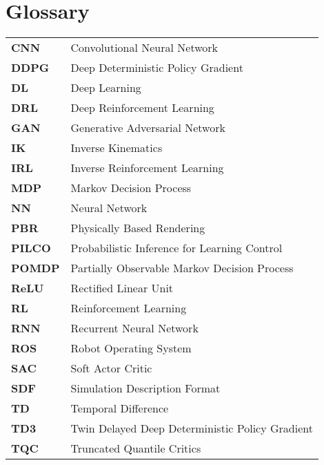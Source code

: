 %
\chapter*{Glossary}

\capstartfalse
\begin{table}[!hb]
    \begin{tabular}{ll}
        \textbf{CNN}   & Convolutional Neural Network                    \\
        \textbf{DDPG}  & Deep Deterministic Policy Gradient              \\
        \textbf{DL}    & Deep Learning                                   \\
        \textbf{DRL}   & Deep Reinforcement Learning                     \\
        \textbf{GAN}   & Generative Adversarial Network                  \\
        \textbf{IK}    & Inverse Kinematics                              \\
        \textbf{IRL}   & Inverse Reinforcement Learning                  \\
        \textbf{MDP}   & Markov Decision Process                         \\
        \textbf{NN}    & Neural Network                                  \\
        \textbf{PBR}   & Physically Based Rendering                      \\
        \textbf{PILCO} & Probabilistic Inference for Learning Control    \\
        \textbf{POMDP} & Partially Observable Markov Decision Process    \\
        \textbf{ReLU}  & Rectified Linear Unit                           \\
        \textbf{RL}    & Reinforcement Learning                          \\
        \textbf{RNN}   & Recurrent Neural Network                        \\
        \textbf{ROS}   & Robot Operating System                          \\
        \textbf{SAC}   & Soft Actor Critic                               \\
        \textbf{SDF}   & Simulation Description Format                   \\
        \textbf{TD}    & Temporal Difference                             \\
        \textbf{TD3}   & Twin Delayed Deep Deterministic Policy Gradient \\
        \textbf{TQC}   & Truncated Quantile Critics                      \\
    \end{tabular}
\end{table}
\capstarttrue
